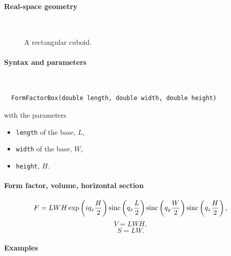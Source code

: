 \paragraph{Real-space geometry}\strut\\

\begin{figure}[H]
\hfill
{}
\hfill
{}
\hfill
{}
\hfill
\caption{A rectangular cuboid.}
\end{figure}

\FloatBarrier

\paragraph{Syntax and parameters}\strut\\[-2ex plus .2ex minus .2ex]
\begin{lstlisting}
  FormFactorBox(double length, double width, double height)
\end{lstlisting}
with the parameters
\begin{itemize}
\item \texttt{length} of the base, $L$,
\item \texttt{width} of the base, $W$,
\item \texttt{height}, $H$.
\end{itemize}

\paragraph{Form factor, volume, horizontal section}

\begin{equation*}
F= L W H\exp\left(i q_z \frac{H}{2}\right) \operatorname{sinc}\left(q_x \frac{L}{2}\right)
\operatorname{sinc}\left(q_y \frac{W}{2}\right) \operatorname{sinc}\left(q_z \frac{H}{2}\right),
\end{equation*}
\begin{equation*}
  V= LWH,
\end{equation*}
\begin{equation*}
  S = LW.
\end{equation*}

\paragraph{Examples}\strut

